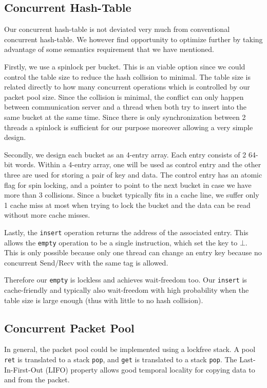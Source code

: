 \documentclass{sig-alternate-05-2015}
\begin{document}
\subsection{Concurrent Hash-Table}
Our concurrent hash-table is not deviated very much from conventional
concurrent hash-table. We however find opportunity to optimize further by taking 
advantage of some semantics requirement that we have mentioned.

Firstly, we use a spinlock per bucket. This is an viable option since we could
control the table size to reduce the hash collision to minimal. The table size is
related directly to how many concurrent operations which is controlled by 
our packet pool size. Since the collision is minimal, the conflict can only happen
between communication server and a thread when both try to insert into the same
bucket at the same time. Since there is only synchronization between 2 threads
a spinlock is sufficient for our purpose moreover allowing a very simple design.

Secondly, we design each bucket as an 4-entry array. Each entry consists of 2
64-bit words. Within a 4-entry array, one will be used as control entry and the
other three are used for storing a pair of key and data. The control entry has
an atomic flag for spin locking, and a pointer to point to the next bucket in
case we have more than 3 collisions. Since a bucket typically fits in a cache
line, we suffer only 1 cache miss at most when trying to lock the bucket and
the data can be read without more cache misses.

Lastly, the \texttt{insert} operation returns the address of the associated
entry. This allows the \texttt{empty} operation to be a single instruction,
which set the key to $\bot$. This is only possible because only one thread can
change an entry key because no concurrent Send/Recv with the same tag is allowed.

Therefore our \texttt{empty} is lockless and achieves wait-freedom too. Our
\texttt{insert} is cache-friendly and typically also wait-freedom with high probability 
when the table size is large enough (thus with little to no hash collision).

\subsection{Concurrent Packet Pool}
In general, the packet pool could be implemented using a lockfree stack. A pool
\texttt{ret} is translated to a stack \texttt{pop}, and \texttt{get} is
translated to a stack \texttt{pop}.  The Last-In-First-Out (LIFO) property
allows good temporal locality for copying data to and from the packet.
\end{document}
